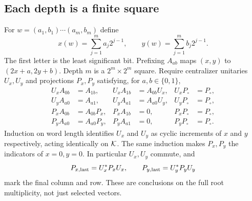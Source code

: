 \subsection{Each depth is a finite square}
For $w=(a_1,b_1)\cdots(a_m,b_m)$ define
\[
 x(w)=\sum_{j=1}^m a_j2^{j-1},\qquad
 y(w)=\sum_{j=1}^m b_j2^{j-1}.
\]
The first letter is the least significant bit. Prefixing $A_{ab}$ maps $(x,y)$ to $(2x+a,2y+b)$. Depth $m$ is a $2^m\times2^m$ square. Require centralizer unitaries $U_x,U_y$ and projections $P_x,P_y$ satisfying, for $a,b\in\{0,1\}$,
\begin{align}
 U_xA_{0b}&=A_{1b},&U_xA_{1b}&=A_{0b}U_x,&U_xP_{\circ}&=P_{\circ},\label{eq:U_x}\\
 U_yA_{a0}&=A_{a1},&U_yA_{a1}&=A_{a0}U_y,&U_yP_{\circ}&=P_{\circ},\label{eq:U_y}\\
 P_xA_{0b}&=A_{0b}P_x,&P_xA_{1b}&=0,&P_xP_{\circ}&=P_{\circ},\label{eq:P_x}\\
 P_yA_{a0}&=A_{a0}P_y,&P_yA_{a1}&=0,&P_yP_{\circ}&=P_{\circ}.\label{eq:P_y}
\end{align}
Induction on word length identifies $U_x$ and $U_y$ as cyclic increments of $x$ and $y$ respectively, acting identically on $\mathcal K$. The same induction makes $P_x,P_y$ the indicators of $x=0,y=0$. In particular $U_x,U_y$ commute, and
\[
 P_{x,\rm last}=U_x^*P_xU_x,\qquad P_{y,\rm last}=U_y^*P_yU_y
\]
mark the final column and row. These are conclusions on the full root multiplicity, not just selected vectors.


